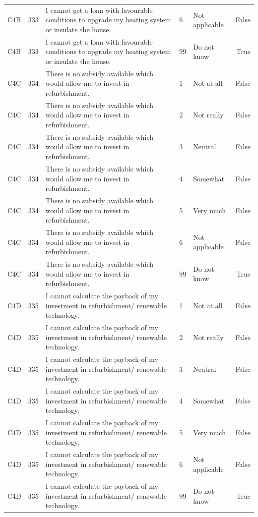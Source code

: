 \begin{tabular}{lrlllr}
C4B & 333 &  I cannot get a loan with favourable conditions to upgrade my heating system or insulate the house. & 6 & Not applicable & False \\
C4B & 333 &  I cannot get a loan with favourable conditions to upgrade my heating system or insulate the house. & 99 & Do not know & True \\
C4C & 334 & There is no subsidy available which would allow me to invest in refurbishment. & 1 & Not at all & False \\
C4C & 334 & There is no subsidy available which would allow me to invest in refurbishment. & 2 & Not really & False \\
C4C & 334 & There is no subsidy available which would allow me to invest in refurbishment. & 3 & Neutral & False \\
C4C & 334 & There is no subsidy available which would allow me to invest in refurbishment. & 4 & Somewhat & False \\
C4C & 334 & There is no subsidy available which would allow me to invest in refurbishment. & 5 & Very much & False \\
C4C & 334 & There is no subsidy available which would allow me to invest in refurbishment. & 6 & Not applicable & False \\
C4C & 334 & There is no subsidy available which would allow me to invest in refurbishment. & 99 & Do not know & True \\
C4D & 335 & I cannot calculate the payback of my investment in refurbishment/ renewable technology. & 1 & Not at all & False \\
C4D & 335 & I cannot calculate the payback of my investment in refurbishment/ renewable technology. & 2 & Not really & False \\
C4D & 335 & I cannot calculate the payback of my investment in refurbishment/ renewable technology. & 3 & Neutral & False \\
C4D & 335 & I cannot calculate the payback of my investment in refurbishment/ renewable technology. & 4 & Somewhat & False \\
C4D & 335 & I cannot calculate the payback of my investment in refurbishment/ renewable technology. & 5 & Very much & False \\
C4D & 335 & I cannot calculate the payback of my investment in refurbishment/ renewable technology. & 6 & Not applicable & False \\
C4D & 335 & I cannot calculate the payback of my investment in refurbishment/ renewable technology. & 99 & Do not know & True \\

\end{tabular}
